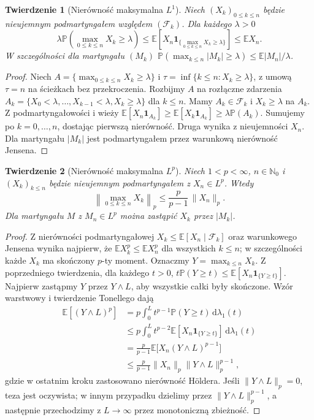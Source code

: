 \documentclass[11pt,a4paper,oneside]{report}
\numberwithin{equation}{chapter}
\theoremstyle{plain}
\newtheorem{twierdzenie}{Twierdzenie}[chapter]
\theoremstyle{definition}
\theoremstyle{remark}
\newcommand{\N}{\mathbb{N}}
\newcommand{\Prob}{\mathbb{P}}
\newcommand{\E}{\mathbb{E}}
\newcommand{\ind}[1]{\mathbf{1}_{#1}}
\newcommand{\dd}{\mathrm{d}}
\begin{document}
\begin{twierdzenie}[Nierówność maksymalna $L^1$]
Niech $(X_k)_{0\leq k\leq n}$ będzie nieujemnym
podmartyngałem względem $(\mathcal F_k)$.
Dla każdego $\lambda>0$
\[
\lambda\Prob\left(\max_{0\leq k\leq n}X_k\geq\lambda\right)
\leq\E\left[X_n\ind{\{\max_{0\leq k\leq n}X_k\geq\lambda\}}\right]
\leq\E X_n.
\]
W szczególności dla martyngału $(M_k)$
$\Prob(\max_{k\leq n}|M_k|\geq\lambda)
\leq\E|M_n|/\lambda$.
\end{twierdzenie}
\begin{proof}
Niech $A=\{\max_{0\leq k\leq n}X_k\geq\lambda\}$
i $\tau=\inf\{k\leq n:X_k\geq\lambda\}$,
z umową $\tau=n$ na ścieżkach bez przekroczenia.
Rozbijmy $A$ na rozłączne zdarzenia
$A_k=\{X_0<\lambda,\ldots,X_{k-1}<\lambda,
X_k\geq\lambda\}$ dla $k\leq n$.
Mamy $A_k\in\mathcal F_k$ i
$X_k\geq\lambda$ na $A_k$.
Z podmartyngałowości i wieży
$\E[X_n\ind{A_k}]\geq\E[X_k\ind{A_k}]
\geq\lambda\Prob(A_k)$.
Sumujemy po $k=0,\ldots,n$, dostając pierwszą
nierówność. Druga wynika z nieujemności $X_n$.
Dla martyngału $|M_k|$ jest podmartyngałem
przez warunkową nierówność Jensena.
\end{proof}

\begin{twierdzenie}[Nierówność maksymalna $L^p$]
Niech $1<p<\infty$, $n\in\N_0$ i
$(X_k)_{k\leq n}$ będzie nieujemnym
podmartyngałem z $X_n\in L^p$. Wtedy
\[
\left\|\max_{0\leq k\leq n}X_k\right\|_p
\leq\frac{p}{p-1}\,\|X_n\|_p.
\]
Dla martyngału $M$ z $M_n\in L^p$ można
zastąpić $X_k$ przez $|M_k|$.
\end{twierdzenie}
\begin{proof}
Z nierówności podmartyngałowej $X_k\leq
\E[X_n\mid\mathcal F_k]$ oraz warunkowego
Jensena wynika najpierw, że
$\E X_k^p\leq\E X_n^p$ dla wszystkich $k\leq n$;
w szczególności każde $X_k$ ma skończony $p$-ty moment.
Oznaczmy $Y=\max_{k\leq n}X_k$.
Z poprzedniego twierdzenia, dla każdego $t>0$,
$t\Prob(Y\geq t)\leq\E[X_n\ind{\{Y\geq t\}}]$.
Najpierw zastąpmy $Y$ przez $Y\wedge L$,
aby wszystkie całki były skończone.
Wzór warstwowy i twierdzenie Tonellego dają
\begin{align*}
\E[(Y\wedge L)^p]
&=p\int_0^L t^{p-1}\Prob(Y\geq t)\,\dd\lambda_1(t)\\
&\leq p\int_0^L t^{p-2}
\E[X_n\ind{\{Y\geq t\}}] \,\dd\lambda_1(t)\\
&=\frac{p}{p-1}\E\bigl[X_n(Y\wedge L)^{p-1}\bigr]\\
&\leq\frac{p}{p-1}\|X_n\|_p
\|Y\wedge L\|_p^{p-1},
\end{align*}
gdzie w ostatnim kroku zastosowano nierówność
Höldera. Jeśli $\|Y\wedge L\|_p=0$, teza jest
oczywista; w innym przypadku dzielimy przez
$\|Y\wedge L\|_p^{p-1}$, a następnie
przechodzimy z $L\to\infty$ przez monotoniczną
zbieżność.
\end{proof}
\end{document}
